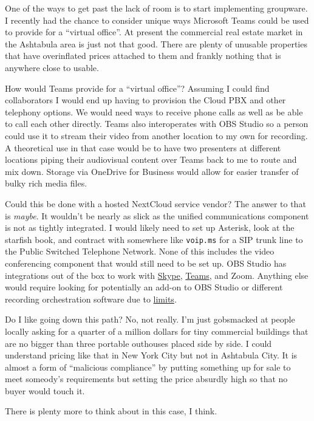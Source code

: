One of the ways to get past the lack of room is to start implementing
groupware. I recently had the chance to consider unique ways Microsoft
Teams could be used to provide for a ``virtual office''. At present the
commercial real estate market in the Ashtabula area is just not that
good. There are plenty of unusable properties that have overinflated
prices attached to them and frankly nothing that is anywhere close to
usable.

How would Teams provide for a ``virtual office''? Assuming I could find
collaborators I would end up having to provision the Cloud PBX and other
telephony options. We would need ways to receive phone calls as well as
be able to call each other directly. Teams also interoperates with OBS
Studio so a person could use it to stream their video from another
location to my own for recording. A theoretical use in that case would
be to have two presenters at different locations piping their
audiovisual content over Teams back to me to route and mix down. Storage
via OneDrive for Business would allow for easier transfer of bulky rich
media files.

Could this be done with a hosted NextCloud service vendor? The answer to
that is \emph{maybe}. It wouldn't be nearly as slick as the unified
communications component is not as tightly integrated. I would likely
need to set up Asterisk, look at the starfish book, and contract with
somewhere like \texttt{voip.ms} for a SIP trunk line to the Public
Switched Telephone Network. None of this includes the video conferencing
component that would still need to be set up. OBS Studio has
integrations out of the box to work with
\href{https://techcommunity.microsoft.com/t5/modern-work-app-consult-blog/how-to-host-a-live-streaming-with-multiple-participants-using/ba-p/1291745}{Skype},
\href{https://adoption.microsoft.com/en-us/inside-microsoft-teams/bonus-clips/connecting-microsoft-teams-obs/}{Teams},
and Zoom. Anything else would require looking for potentially an add-on
to OBS Studio or different recording orchestration software due to
\href{https://obsproject.com/kb/virtual-camera-guide}{limits}.

Do I like going down this path? No, not really. I'm just gobsmacked at
people locally asking for a quarter of a million dollars for tiny
commercial buildings that are no bigger than three portable outhouses
placed side by side. I could understand pricing like that in New York
City but not in Ashtabula City. It is almost a form of ``malicious
compliance'' by putting something up for sale to meet someody's
requirements but setting the price absurdly high so that no buyer would
touch it.

There is plenty more to think about in this case, I think.
